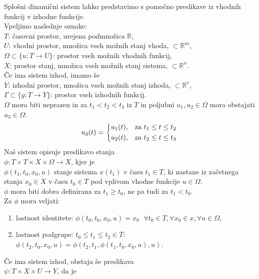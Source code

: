 \documentclass[a4paper, 12pt]{book}
\theoremstyle{definition}
\theoremstyle{remark}
\newcommand{\R}{\mathbb{R}}
\begin{document}
Splošni dinamični sistem lahko predstavimo s pomočno preslikave iz vhodnih funkcij v izhodne funkcije. \\
Vpeljimo naslednje oznake: \\
$T$: časovni prostor, urejena podmnožica $\R$, \\
$U$: vhodni prostor, množica vseh možnih stanj vhoda, $\subset \R^m$, \\
$\Omega \subset \{u: T \to U\}$: prostor vseh možnih vhodnih funkcij, \\
$X$: prostor stanj, množica vseh možnih stanj sistema, $\subset \R^n$. \\
Če ima sistem izhod, imamo še \\
$Y$: izhodni prostor, množica vseh možnih stanj izhoda, $\subset \R^r$, \\
$\Gamma \subset \{y: T \to Y\}$: prostor vseh izhodnih funkcij. \\
$\Omega$ mora biti neprazen in za $t_1 < t_2 < t_3$ iz $T$ in poljubni $u_1, u_2 \in \Omega$ mora obstajati $u_3 \in \Omega$:
\begin{equation*}
  u_3(t) = \begin{cases*}
    u_1(t), & za $t_1 \leq t \leq t_2$ \\
    u_2(t), & za $t_2 \leq t \leq t_3$
  \end{cases*}
\end{equation*}
Naš sistem opisuje preslikavo stanja \\
$\phi: T \times T \times X \times \Omega \to X$, kjer je \\
$\phi(t_1, t_0, x_0, u)$ stanje sistema $x(t_1)$ v času $t_1 \in T$, ki nastane iz začetnega stanja $x_0 \in X$
v času $t_0 \in T$ pod vplivom vhodne funkcije $u \in \Omega$. \\
$\phi$ mora biti dobro definirana za $t_1 \geq t_0$, ne pa tudi za $t_1 < t_0$. \\
Za $\phi$ mora veljati:
\begin{enumerate}[label=\alph*)]
  \item lastnost identitete: $\phi(t_0, t_0, x_0, u) = x_0 \;$ $\forall t_0 \in T, \forall x_0 \in x, \forall u \in \Omega$,
  \item lastnost podgrupe: $t_0 \leq t_1 \leq t_2 \in T: \;$ $\phi(t_2, t_0, x_0, u)
    = \phi(t_2, t_1, \phi(t_1, t_0, x_0, u), u)$.
\end{enumerate}
Če ima sistem izhod, obstaja še preslikava \\
$\psi: T \times X \times U \to Y$, da je \\
\end{document}
